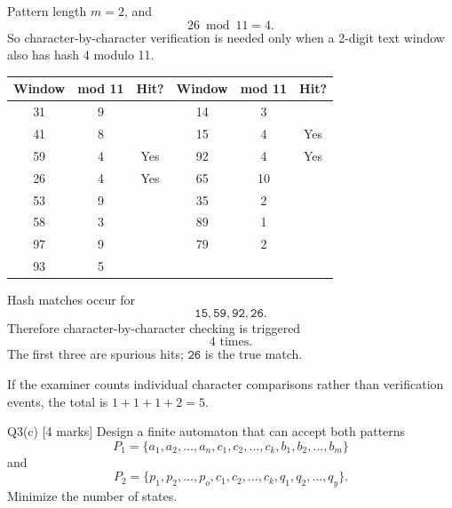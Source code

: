 \documentclass[10.5pt,a4paper]{article}
\begin{document}
\begin{answerbox}
Pattern length \(m=2\), and
\[
26\bmod11=4.
\]
So character-by-character verification is needed only when a 2-digit text window also has hash 4 modulo 11.

\begin{center}
\small
\begin{tabular}{c c c@{\qquad}c c c}
\toprule
Window & mod 11 & Hit? & Window & mod 11 & Hit?\\
\midrule
31&9& &14&3&\\
41&8& &15&4&Yes\\
59&4&Yes&92&4&Yes\\
26&4&Yes&65&10&\\
53&9& &35&2&\\
58&3& &89&1&\\
97&9& &79&2&\\
93&5& & & &\\
\bottomrule
\end{tabular}
\end{center}

Hash matches occur for
\[
\texttt{15},\texttt{59},\texttt{92},\texttt{26}.
\]
Therefore character-by-character checking is triggered
\[
\boxed{4\text{ times}}.
\]
The first three are spurious hits; \(\texttt{26}\) is the true match.

If the examiner counts individual character comparisons rather than verification events, the total is \(1+1+1+2=5\).
\end{answerbox}

\begin{questionbox}{Q3(c) [4 marks]}
Design a finite automaton that can accept both patterns
\[
P_1=\{a_1,a_2,\ldots,a_n,c_1,c_2,\ldots,c_k,b_1,b_2,\ldots,b_m\}
\]
and
\[
P_2=\{p_1,p_2,\ldots,p_o,c_1,c_2,\ldots,c_k,q_1,q_2,\ldots,q_y\}.
\]
Minimize the number of states.
\end{questionbox}
\end{document}
